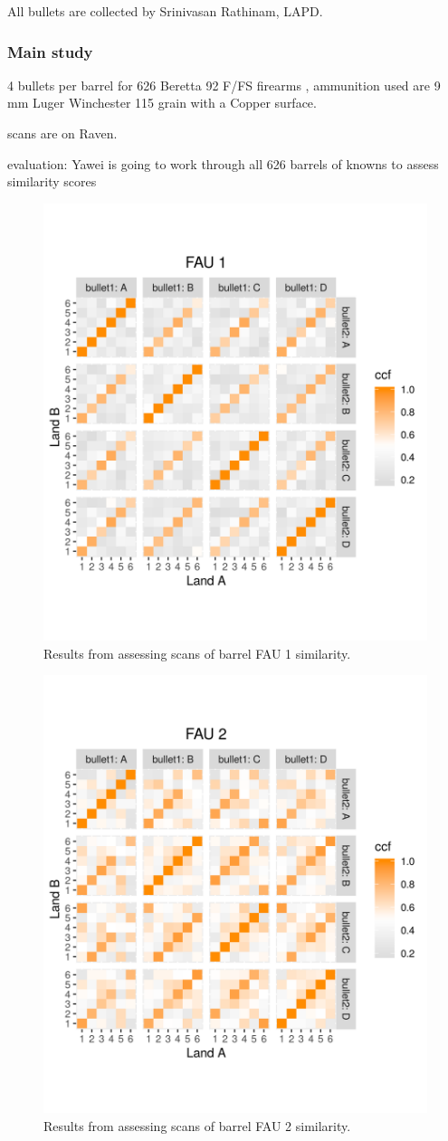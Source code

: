 \documentclass[]{book}
\begin{document}
All bullets are collected by Srinivasan Rathinam, LAPD.

\hypertarget{main-study}{%
\subsubsection{Main study}\label{main-study}}

4 bullets per barrel for 626 Beretta 92 F/FS firearms , ammunition used are 9 mm Luger Winchester 115 grain with a Copper surface.

scans are on Raven.

evaluation: Yawei is going to work through all 626 barrels of knowns to assess similarity scores

\begin{figure}

{\centering \includegraphics[width=0.5\linewidth]{images/yawei/results-FAU-1} 

}

\caption{Results from assessing scans of barrel FAU 1 similarity.}\label{fig:unnamed-chunk-3}
\end{figure}

\begin{figure}

{\centering \includegraphics[width=0.5\linewidth]{images/yawei/results-FAU-2} 

}

\caption{Results from assessing scans of barrel FAU 2 similarity.}\label{fig:unnamed-chunk-4}
\end{figure}
\end{document}
